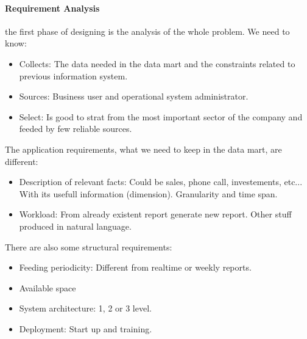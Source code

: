 \documentclass[12pt]{article}
\begin{document}
\paragraph{Requirement Analysis} the first phase of designing is the analysis of the whole problem. We need to know:
\begin{itemize}
  \item Collects: The data needed in the data mart and the constraints related to previous information system.
  \item Sources: Business user and operational system administrator.
  \item Select: Is good to strat from the most important sector of the company and feeded by few reliable sources.
\end{itemize}
The application requirements, what we need to keep in the data mart, are different:
\begin{itemize}
  \item Description of relevant facts: Could be sales, phone call, investements, etc... With its usefull information (dimension). Granularity and time span.
  \item Workload: From already existent report generate new report. Other stuff produced in natural language.
\end{itemize}
There are also some structural requirements:
\begin{itemize}
  \item Feeding periodicity: Different from realtime or weekly reports.
  \item Available space
  \item System architecture: 1, 2 or 3 level.
  \item Deployment: Start up and training.
\end{itemize}
\end{document}
